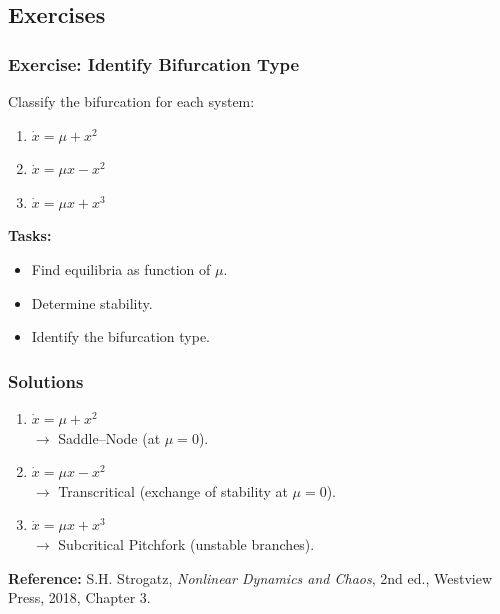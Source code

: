 \documentclass{beamer}
\begin{document}

\subsection{Exercises}

\begin{frame}
\frametitle{Exercise: Identify Bifurcation Type}

Classify the bifurcation for each system:

\begin{enumerate}
    \item \( \dot x = \mu + x^2 \)
    \item \( \dot x = \mu x - x^2 \)
    \item \( \dot x = \mu x + x^3 \)
\end{enumerate}

\medskip
\textbf{Tasks:}
\begin{itemize}
    \item Find equilibria as function of \(\mu\).
    \item Determine stability.
    \item Identify the bifurcation type.
\end{itemize}

\end{frame}

\begin{frame}
\frametitle{Solutions}

\begin{enumerate}
    \item \( \dot x = \mu + x^2 \)\\
    $\to$ Saddle--Node (at \(\mu=0\)).

    \item \( \dot x = \mu x - x^2 \)\\
    $\to$ Transcritical (exchange of stability at \(\mu=0\)).

    \item \( \dot x = \mu x + x^3 \)\\
    $\to$ Subcritical Pitchfork (unstable branches).
\end{enumerate}

\textbf{Reference:} S.H. Strogatz, \emph{Nonlinear Dynamics and Chaos}, 2nd ed., Westview Press, 2018, Chapter 3.

\end{frame}
\end{document}
